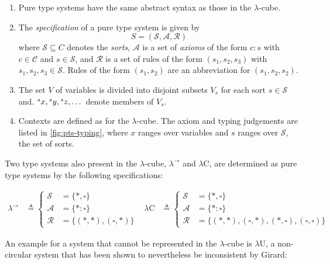 \documentclass[12pt,toc=bibliography,numbers=noendperiod,
               footnotes=multiple,twoside]{scrartcl}
\begin{document}
\begin{enumerate}
\item Pure type systems have the same abstract syntax as those in the \(\lambda\)-cube.
\item The \emph{specification} of a pure type system is given by \[S = (\mathcal{S}, \mathcal{A}, \mathcal{R})\] where \(\mathcal{S} \subseteq C\) denotes the \emph{sorts}, \(\mathcal{A}\) is a set of \emph{axioms} of the form \(c:s\) with \(c \in \mathcal{C}\) and \(s \in \mathcal{S}\), and \(\mathcal{R}\) is a set of rules of the form \((s_1, s_2, s_3)\) with \(s_1, s_2, s_3 \in \mathcal{S}\). Rules of the form \((s_1, s_2)\) are an abbreviation for \((s_1, s_2, s_2)\).
\item The set \(V\) of variables is divided into disjoint subsets \(V_s\) for each sort \(s \in \mathcal{S}\) and. \(\prescript{s}{}x, \prescript{s}{}y, \prescript{s}{}z, \dots\) denote members of \(V_s\).
\item Contexts are defined as for the \(\lambda\)-cube. The axiom and typing judgements are listed in \cref{fig:pts-typing}, where \(x\) ranges over variables and \(s\) ranges over \(\mathcal{S}\), the set of sorts.
\end{enumerate}

Two type systems also present in the \(\lambda\)-cube, \(\lambda^{\rightarrow}\) and \(\lambda\textrm{C}\), are determined as pure type systems by the following specifications:

\begin{align*}
\lambda^{\rightarrow} &\triangleq
    \begin{cases}
        \mathcal{S} &= \{*,\square\} \\
        \mathcal{A} &= \{*:\square\} \\
        \mathcal{R} &= \{(*,*),(\square,*)\}
    \end{cases} &
\lambda\textrm{C} &\triangleq
    \begin{cases}
        \mathcal{S} &= \{*,\square\} \\
        \mathcal{A} &= \{*:\square\} \\
        \mathcal{R} &= \{(*,*),(\square,*),(*,\square),(\square,\square)\}
    \end{cases}
\end{align*}

An example for a system that cannot be represented in the \(\lambda\)-cube is \(\lambda\textrm{U}\), a non-circular system that has been shown to nevertheless be inconsistent by Girard:
\end{document}
